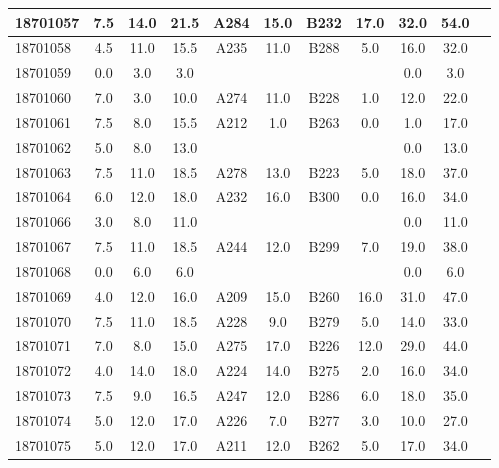 \documentclass[12pt]{article}
\begin{document}
\begin{center}
\begin{small}
\begin{tabular}{|l|c|c|c|c|c|c|c|c|c|c|}
18701057 & 7.5 & 14.0 & 21.5 & A284 & 15.0 & B232 & 17.0 & 32.0 & 54.0\\ \hline 
18701058 & 4.5 & 11.0 & 15.5 & A235 & 11.0 & B288 & 5.0 & 16.0 & 32.0\\ \hline 
18701059 & 0.0 & 3.0 & 3.0 &  &  &  &  & 0.0 & 3.0\\ \hline 
18701060 & 7.0 & 3.0 & 10.0 & A274 & 11.0 & B228 & 1.0 & 12.0 & 22.0\\ \hline 
18701061 & 7.5 & 8.0 & 15.5 & A212 & 1.0 & B263 & 0.0 & 1.0 & 17.0\\ \hline 
18701062 & 5.0 & 8.0 & 13.0 &  &  &  &  & 0.0 & 13.0\\ \hline 
18701063 & 7.5 & 11.0 & 18.5 & A278 & 13.0 & B223 & 5.0 & 18.0 & 37.0\\ \hline 
18701064 & 6.0 & 12.0 & 18.0 & A232 & 16.0 & B300 & 0.0 & 16.0 & 34.0\\ \hline 
18701066 & 3.0 & 8.0 & 11.0 &  &  &  &  & 0.0 & 11.0\\ \hline 
18701067 & 7.5 & 11.0 & 18.5 & A244 & 12.0 & B299 & 7.0 & 19.0 & 38.0\\ \hline 
18701068 & 0.0 & 6.0 & 6.0 &  &  &  &  & 0.0 & 6.0\\ \hline 
18701069 & 4.0 & 12.0 & 16.0 & A209 & 15.0 & B260 & 16.0 & 31.0 & 47.0\\ \hline 
18701070 & 7.5 & 11.0 & 18.5 & A228 & 9.0 & B279 & 5.0 & 14.0 & 33.0\\ \hline 
18701071 & 7.0 & 8.0 & 15.0 & A275 & 17.0 & B226 & 12.0 & 29.0 & 44.0\\ \hline 
18701072 & 4.0 & 14.0 & 18.0 & A224 & 14.0 & B275 & 2.0 & 16.0 & 34.0\\ \hline 
18701073 & 7.5 & 9.0 & 16.5 & A247 & 12.0 & B286 & 6.0 & 18.0 & 35.0\\ \hline 
18701074 & 5.0 & 12.0 & 17.0 & A226 & 7.0 & B277 & 3.0 & 10.0 & 27.0\\ \hline 
18701075 & 5.0 & 12.0 & 17.0 & A211 & 12.0 & B262 & 5.0 & 17.0 & 34.0\\ \hline 
        \end{tabular}
            \end{small}
            \end{center}
  \centering
            
\end{document}
